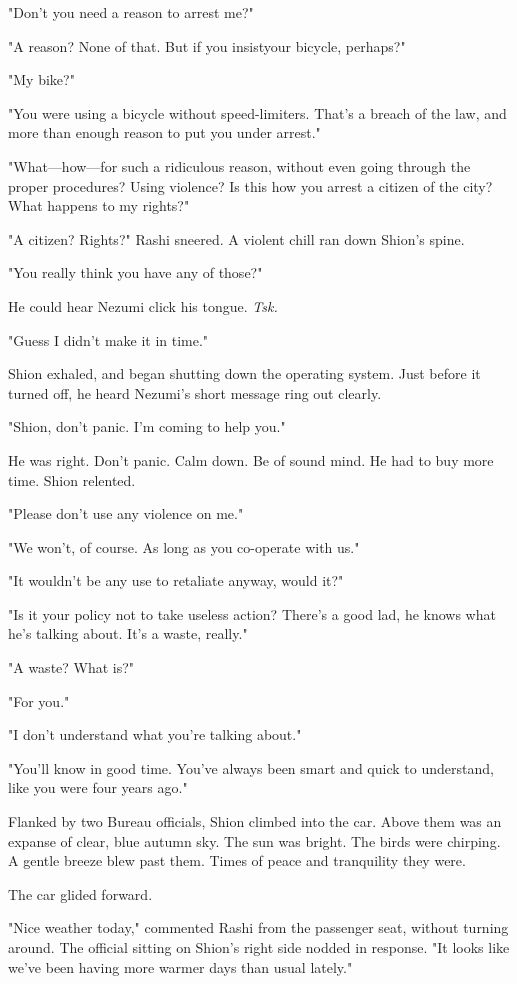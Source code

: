 "Don't you need a reason to arrest me?"

"A reason? None of that. But if you insist\el your bicycle, perhaps?"

"My bike?"

"You were using a bicycle without speed-limiters. That's a breach of the
law, and more than enough reason to put you under arrest."

"What---how---for such a ridiculous reason, without even going through the
proper procedures? Using violence? Is this how you arrest a citizen of
the city? What happens to my rights?"

"A citizen? Rights?" Rashi sneered. A violent chill ran down Shion's
spine.

"You really think you have any of those?"

He could hear Nezumi click his tongue. \emph{Tsk.}

"Guess I didn't make it in time."

Shion exhaled, and began shutting down the operating system. Just before
it turned off, he heard Nezumi's short message ring out clearly.

"Shion, don't panic. I'm coming to help you."

He was right. Don't panic. Calm down. Be of sound mind. He had to buy
more time. Shion relented.

"Please don't use any violence on me."

"We won't, of course. As long as you co-operate with us."

"It wouldn't be any use to retaliate anyway, would it?"

"Is it your policy not to take useless action? There's a good lad, he
knows what he's talking about. It's a waste, really."

"A waste? What is?"

"For you."

"I don't understand what you're talking about."

"You'll know in good time. You've always been smart and quick to
understand, like you were four years ago."

Flanked by two Bureau officials, Shion climbed into the car. Above them
was an expanse of clear, blue autumn sky. The sun was bright. The birds
were chirping. A gentle breeze blew past them. Times of peace and
tranquility they were.

\mybreak

The car glided forward.

"Nice weather today," commented Rashi from the passenger seat, without
turning around. The official sitting on Shion's right side nodded in
response. "It looks like we've been having more warmer days than usual
lately."

